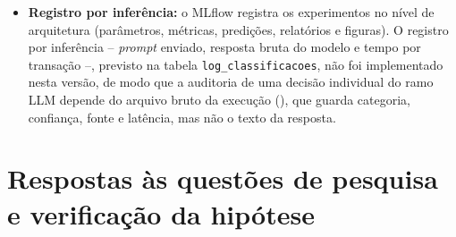 \begin{itemize}
	reduzindo progressivamente o acionamento do LLM em compras recorrentes. Ressalva-se que a etapa de povoamento inicial da base (, opção de persistência) reconstrói a coleção a partir do zero, descartando as retroalimentações acumuladas; em produção, essa etapa deve ser executada uma única vez, ou substituída por uma carga incremental;
	\item \textbf{Registro por inferência:} o MLflow registra os experimentos no nível de arquitetura (parâmetros, métricas, predições, relatórios e figuras). O registro por inferência -- \textit{prompt} enviado, resposta bruta do modelo e tempo por transação --, previsto na tabela \texttt{log\_classificacoes}, não foi implementado nesta versão, de modo que a auditoria de uma decisão individual do ramo LLM depende do arquivo bruto da execução (), que guarda categoria, confiança, fonte e latência, mas não o texto da resposta.
\end{itemize}

\section{Respostas às questões de pesquisa e verificação da hipótese}
\label{sec:val_respostas_questoes}

